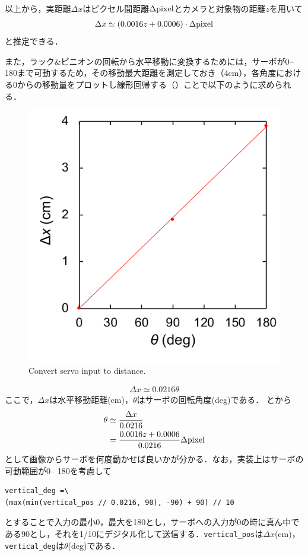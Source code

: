 以上から，実距離$\Delta x$はピクセル間距離$\Delta \rm{pixel}$とカメラと対象物の距離$z$を用いて
\begin{align}\label{eq:ピクセル間距離}
\Delta x \simeq (0.0016z + 0.0006) \cdot \Delta \rm{pixel}
\end{align}
と推定できる．

また，ラック\&ピニオンの回転から水平移動に変換するためには，サーボが0\deg -- 180\deg まで可動するため，その移動最大距離を測定しておき（4cm），各角度における0\deg からの移動量をプロットし線形回帰する（）ことで以下のように求められる．

\begin{figure}[H]
    \centering
    \includegraphics[width=0.5\linewidth]{figure/chapter4/servo2distance}
    \caption{Convert servo input to distance.}
    \label{fig:servo2dist}
\end{figure}


\begin{align}\label{eq:スライド角度}
\Delta x \simeq 0.0216 \theta
\end{align}
ここで，$\Delta x$は水平移動距離(cm)，$\theta$はサーボの回転角度(deg)である．
とから
\begin{align}
\theta & \simeq \dfrac{\Delta x}{0.0216} \\
& = \dfrac{0.0016z + 0.0006}{0.0216} \Delta \rm{pixel} \\
\end{align}
として画像からサーボを何度動かせば良いかが分かる．なお，実装上はサーボの可動範囲が0\deg -- 180\deg を考慮して
\begin{lstlisting}[label=code:servo]
vertical_deg =\
(max(min(vertical_pos // 0.0216, 90), -90) + 90) // 10
\end{lstlisting}
とすることで入力の最小0，最大を180とし，サーボへの入力が0の時に真ん中である90\deg とし，それを1/10にデジタル化して送信する．\texttt{vertical\_pos}は$\Delta x$(cm)，\texttt{vertical\_deg}は$\theta$(deg)である．


